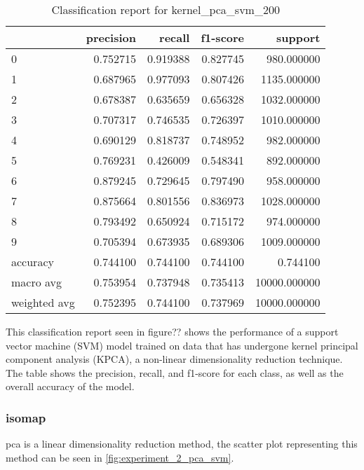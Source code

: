 \begin{table}[htb!]
    \centering
    \caption{Classification report for kernel_pca_svm_200}
    \label{tab:classification-report-kernel_pca_svm_200}
    \begin{tabular}{lrrrr}
    \toprule
     & precision & recall & f1-score & support \\
    \midrule
    0 & 0.752715 & 0.919388 & 0.827745 & 980.000000 \\
    1 & 0.687965 & 0.977093 & 0.807426 & 1135.000000 \\
    2 & 0.678387 & 0.635659 & 0.656328 & 1032.000000 \\
    3 & 0.707317 & 0.746535 & 0.726397 & 1010.000000 \\
    4 & 0.690129 & 0.818737 & 0.748952 & 982.000000 \\
    5 & 0.769231 & 0.426009 & 0.548341 & 892.000000 \\
    6 & 0.879245 & 0.729645 & 0.797490 & 958.000000 \\
    7 & 0.875664 & 0.801556 & 0.836973 & 1028.000000 \\
    8 & 0.793492 & 0.650924 & 0.715172 & 974.000000 \\
    9 & 0.705394 & 0.673935 & 0.689306 & 1009.000000 \\
    accuracy & 0.744100 & 0.744100 & 0.744100 & 0.744100 \\
    macro avg & 0.753954 & 0.737948 & 0.735413 & 10000.000000 \\
    weighted avg & 0.752395 & 0.744100 & 0.737969 & 10000.000000 \\
    \bottomrule
    \end{tabular}
    \end{table}


This classification report seen in figure?? shows the performance of a support vector machine (SVM) model trained on data that has undergone kernel principal component analysis (KPCA), a non-linear dimensionality reduction technique. The table shows the precision, recall, and f1-score for each class, as well as the overall accuracy of the model.



\subsubsection{\gls{isomap}}\label{subsubsec:experiment_4_isomap}
\gls{pca} is a linear dimensionality reduction method, the scatter plot representing this method can be seen in \autoref{fig:experiment_2_pca_svm}. 


